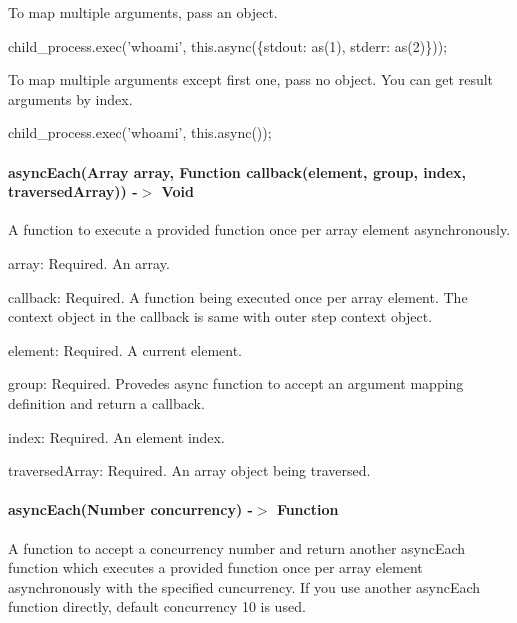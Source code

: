 To map multiple arguments, pass an object.


\begin{DoxyCode}
child\_process.exec(\textcolor{stringliteral}{'whoami'}, this.async(\{stdout: as(1), stderr: as(2)\}));
\end{DoxyCode}


To map multiple arguments except first one, pass no object. You can get result arguments by index.


\begin{DoxyCode}
child\_process.exec(\textcolor{stringliteral}{'whoami'}, this.async());
\end{DoxyCode}


\paragraph*{async\+Each(\+Array array, Function callback(element, group, index, traversed\+Array)) -\/$>$ Void}

A function to execute a provided function once per array element asynchronously.


\begin{DoxyItemize}
\item {\ttfamily array}\+: Required. An array.
\item {\ttfamily callback}\+: Required. A function being executed once per array element. The context object in the callback is same with outer step context object.
\item {\ttfamily element}\+: Required. A current element.
\item {\ttfamily group}\+: Required. Provedes {\ttfamily async} function to accept an argument mapping definition and return a callback.
\item {\ttfamily index}\+: Required. An element index.
\item {\ttfamily traversed\+Array}\+: Required. An array object being traversed.
\end{DoxyItemize}

\paragraph*{async\+Each(\+Number concurrency) -\/$>$ Function}

A function to accept a concurrency number and return another {\ttfamily async\+Each} function which executes a provided function once per array element asynchronously with the specified cuncurrency. If you use another {\ttfamily async\+Each} function directly, default concurrency 10 is used.


